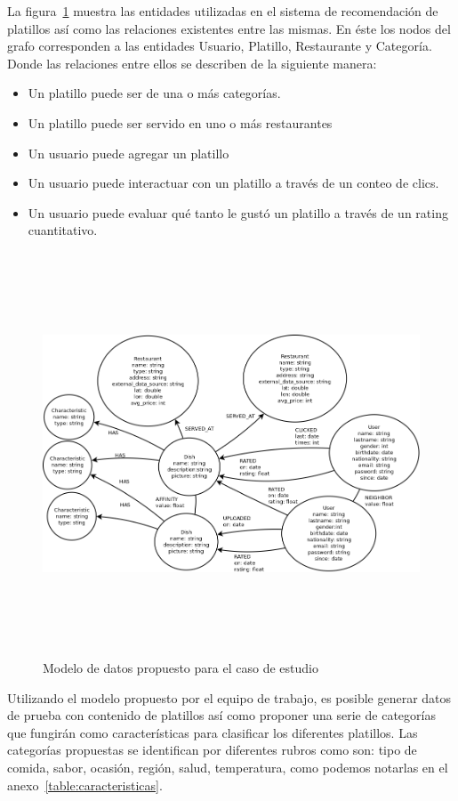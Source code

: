 La figura~\ref{fig:data model} muestra las entidades utilizadas en el sistema de recomendación de platillos así como las relaciones existentes entre las mismas. En éste los nodos del grafo corresponden a las entidades Usuario, Platillo, Restaurante y Categoría. Donde las relaciones entre ellos se describen de la siguiente manera: 
\begin{itemize}
	\item Un platillo puede ser de una o más categorías.
	\item Un platillo puede ser servido en uno o más restaurantes
	\item Un usuario puede agregar un platillo
	\item Un usuario puede interactuar con un platillo a través de un conteo de clics.
	\item Un usuario puede evaluar qué tanto le gustó un platillo a través de un rating cuantitativo.
\end{itemize} 

\begin{landscape}
	\begin{figure}[h!]
		\centering
		\includegraphics[width=22.5cm,height=12cm]{./images/sc_data_model.png}
		\caption{Modelo de datos propuesto para el caso de estudio}
		\label{fig:data model}
	\end{figure}
\end{landscape}

Utilizando el modelo propuesto por el equipo de trabajo, es posible generar datos de prueba con contenido de platillos así como proponer una serie de categorías que fungirán como características para clasificar los diferentes platillos. Las categorías propuestas se identifican por diferentes rubros como son: tipo de comida, sabor, ocasión, región, salud, temperatura, como podemos notarlas en el anexo~\ref{table:caracteristicas}.\cite{23,24} \\

